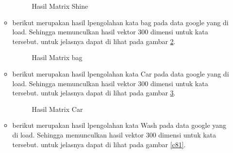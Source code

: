 \begin{enumerate}
\begin{itemize}
\begin{figure}[!htbp]
      \caption{Hasil Matrix Shine}
      \label{c78}
      \end{figure}

\item berikut merupakan hasil lpengolahan kata bag pada data google yang di load. Sehingga memunculkan hasil vektor 300 dimensi untuk kata tersebut. untuk jelasnya dapat di lihat pada gambar \ref{c79}.

\begin{figure}[!htbp]
      \caption{Hasil Matrix bag}
      \label{c79}
      \end{figure}

\item berikut merupakan hasil lpengolahan kata Car pada data google yang di load. Sehingga memunculkan hasil vektor 300 dimensi untuk kata tersebut. untuk jelasnya dapat di lihat pada gambar \ref{c80}.

\begin{figure}[!htbp]
      \caption{Hasil Matrix Car}
      \label{c80}
      \end{figure}


\item berikut merupakan hasil lpengolahan kata Wash pada data google yang di load. Sehingga memunculkan hasil vektor 300 dimensi untuk kata tersebut. untuk jelasnya dapat di lihat pada gambar \ref{c81}.


\end{itemize}
\end{enumerate}
